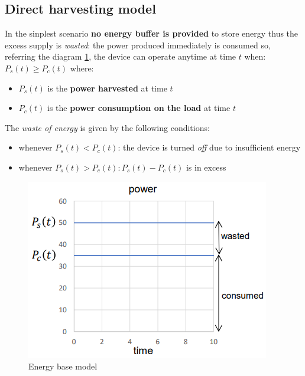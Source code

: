 \documentclass[10pt,a4paper]{report}
\theoremstyle{definition}
\begin{document}
\subsection{Direct harvesting model}\label{sec:direct-harvesting-model}
In the sinplest scenario \textbf{no energy buffer is provided} to store energy thus the excess supply is \textit{wasted}: the power produced immediately is consumed so, referring the diagram \ref{base-diagram-energy}, the device can operate anytime at time $t$ when:
$P_{s}(t) \geq P_{c}(t)$
where:
\begin{itemize}
	\item 
	$P_{s}(t)$ is the \textbf{power harvested} at time $t$
	\item 
	$P_{c}(t)$ is the \textbf{power consumption on the load} at time $t$
\end{itemize}
The \textit{waste of energy} is given by the following conditions:
\begin{itemize}
	\item 
	whenever $P_{s}(t) < P_{c}(t)$: the device is turned \textit{off} due to insufficient energy
	\item 
	whenever $P_{s}(t) > P_{c}(t) : P_{s}(t)-P_{c}(t)$ is in excess
\end{itemize}

\begin{figure}[h]
	\centering\includegraphics[scale=0.50]{images/Pasted image 20230424163616.png}
	\caption{Energy base model}
\label{base-diagram-energy}
\end{figure}
\end{document}
